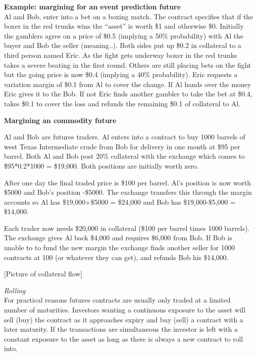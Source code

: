 \documentclass{tran-l}
\theoremstyle{definition}
\theoremstyle{remark}
\numberwithin{equation}{subsection}
\begin{document}
\medskip
\textbf{Example: margining for an event prediction future}\\

Al and Bob, enter into a bet on a boxing match. The contract specifies that if the boxer in the red trunks wins the ``asset'' is worth \$1 and otherwise \$0. Initially the gamblers agree on a price of \$0.5 (implying a 50\% probability) with Al the buyer and Bob the seller (meaning..). Both sides put up \$0.2 in collateral to a third person named Eric. As the fight gets underway boxer in the red trunks takes a severe beating in the first round. Others are still placing bets on the fight but the going price is now \$0.4 (implying a 40\% probability). Eric requests a variation margin of \$0.1 from Al to cover the change. If Al hands over the money Eric gives it to the Bob. If not Eric finds another gambler to take the bet at \$0.4, takes \$0.1 to cover the loss and refunds the remaining \$0.1 of collateral to Al. 

\medskip
\textbf{Margining an commodity future}

Al and Bob are futures traders. Al enters into a contract to buy 1000 barrels of west Texas Intermediate crude from Bob for delivery in one month at \$95 per barrel. Both Al and Bob post 20\% collateral with the exchange which comes to  \$95*0.2*1000 = \$19,000. Both positions are initially worth zero.

After one day the final traded price is \$100 per barrel. Al's position is now worth \$5000 and Bob's position -\$5000. The exchange transfers this through the margin accounts so Al has \$19,000+\$5000 = \$24,000 and Bob has \$19,000-\$5,000 = \$14,000. 

Each trader now needs \$20,000 in collateral (\$100 per barrel times 1000 barrels). The exchange gives Al back \$4,000 and requires \$6,000 from Bob. If Bob is unable to to fund the new margin the exchange finds another seller for 1000 contracts at 100 (or whatever they can get), and refunds Bob his \$14,000. 
 
[Picture of collateral flow]

\textit{Rolling}\\

For practical reasons futures contracts are usually only traded at a limited number of  maturities. Investors wanting a continuous exposure to the asset will sell (buy) the contract as it approaches expiry and buy (sell) a contract with a later maturity. If the transactions are simultaneous the investor is left with a constant exposure to the asset as long as there is always a new contract to roll into.
\end{document}
